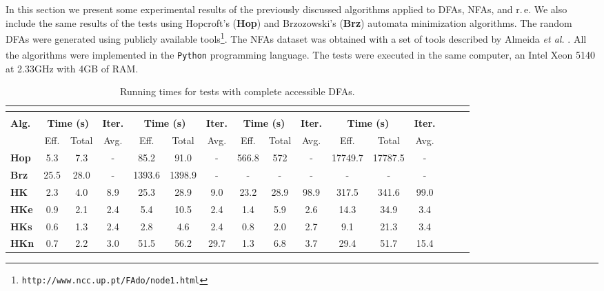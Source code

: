 \documentclass[copyright]{eptcs}
\newcommand{\dfas}{DFAs\xspace}
\newcommand{\nfas}{NFAs\xspace}
\newcommand{\re}{r.\,e.\xspace}
\newcommand{\hop}{\textbf{Hop}\xspace}
\newcommand{\brz}{\textbf{Brz}\xspace}
\begin{document}
In this section we present some experimental results of the previously
discussed algorithms applied to \dfas, \nfas, and \re We also include
the same results of the tests using Hopcroft's (\hop{}) and
Brzozowski's (\brz{})
\cite{brzozowski63_c:_canon_regul_expres_and_minim} 
automata
minimization algorithms. The random \dfas were generated using
publicly available
tools\footnote{{\tt http://www.ncc.up.pt/FAdo/node1.html}}\cite{almeida07_c:_enumer_gener_strin_autom_repres}. The \nfas
dataset was obtained with a set of tools described by Almeida \emph{et
  al.} \cite{almeida08:_perfor_of_autom_minim_algor}.
All the algorithms were implemented in the \texttt{Python} programming
language. The tests were executed in the same computer, an
Intel\textsuperscript{\textregistered}
Xeon\textsuperscript{\textregistered} 5140 at 2.33GHz with 4GB of RAM.
\begin{table}[ht]
  \caption{Running times for tests with complete accessible \dfas.}
  \label{tab:icdfa}
  \centering
  \footnotesize
  \begin{tabular}[h]{|l|c|c|c|c|c|c|c|c|c|c|c|c|c|c|c|}
    \hline
    &\multicolumn{6}{|c|}{} & \multicolumn{6}{|c|}{} \\ 
\hline
    &\multicolumn{3}{|c|}{} & \multicolumn{3}{|c|}{} &
    \multicolumn{3}{|c|}{} & \multicolumn{3}{|c|}{} \\
    \hline
    \bf Alg. &\multicolumn{2}{|c|}{\bf Time (s)} & {\bf Iter.} &
    \multicolumn{2}{|c|}{\bf Time (s)} & {\bf Iter.} &
    \multicolumn{2}{|c|}{\bf Time (s)} & {\bf Iter.} &
    \multicolumn{2}{|c|}{\bf Time (s)} & {\bf Iter.} \\
    \hline
    &Eff. & Total & Avg. & Eff. & Total & Avg. & Eff. & Total & Avg. & Eff. & Total & Avg. \\
    \hline
    \bf Hop	&5.3	&7.3	&-    &85.2	&91.0	&-     &566.8   &572	&- &17749.7 &17787.5	&- \\
    \bf Brz	&25.5	&28.0	&-    &1393.6	&1398.9 &-     &-	&-	&-   &-	   &-	        &- \\
    \bf HK	&2.3	&4.0	&8.9  &25.3	&28.9	&9.0   &23.2	&28.9	&98.9 &317.5   &341.6	&99.0 \\
    \bf HKe	&0.9	&2.1	&2.4  &5.4	&10.5	&2.4   &1.4	&5.9	&2.6 &14.3	   &34.9	&3.4 \\
    \bf HKs     &0.6	&1.3	&2.4  &2.8	&4.6	&2.4   &0.8	&2.0	&2.7 &9.1	   &21.3	&3.4 \\
    \bf HKn	&0.7	&2.2	&3.0  &51.5     &56.2   &29.7  &1.3	&6.8	&3.7 &29.4	   &51.7	&15.4 \\
    \hline
  \end{tabular}
\end{table}
\end{document}

